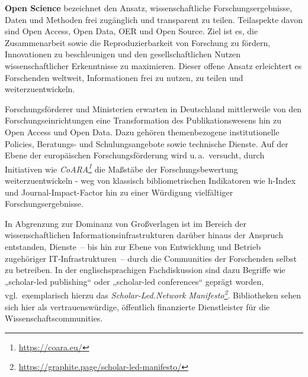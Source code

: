 \documentclass[
  11pt,
  letterpaper,
  DIV=11,
  twoside]{scrreprt}
\DeclareRobustCommand{\href}[2]{#2\footnote{\url{#1}}}
\begin{document}
\begin{tcolorbox}[enhanced jigsaw, leftrule=.75mm, toprule=.15mm, left=2mm, opacityback=0, arc=.35mm, colback=white, breakable, colframe=quarto-callout-important-color-frame, rightrule=.15mm, bottomrule=.15mm]
\begin{minipage}[t]{5.5mm}
\textcolor{quarto-callout-important-color}{\faExclamation}
\end{minipage}%
\begin{minipage}[t]{\textwidth - 5.5mm}

\textbf{Open Science} bezeichnet den Ansatz, wissenschaftliche
Forschungsergebnisse, Daten und Methoden frei zugänglich und transparent
zu teilen. Teilaspekte davon sind Open Access, Open Data, OER und Open
Source. Ziel ist es, die Zusammenarbeit sowie die Reproduzierbarkeit von
Forschung zu fördern, Innovationen zu beschleunigen und den
gesellschaftlichen Nutzen wissenschaftlicher Erkenntnisse zu maximieren.
Dieser offene Ansatz erleichtert es Forschenden weltweit, Informationen
frei zu nutzen, zu teilen und weiterzuentwickeln.

\end{minipage}%
\end{tcolorbox}

Forschungsförderer und Ministerien erwarten in Deutschland mittlerweile
von den Forschungseinrichtungen eine Transformation des
Publikationswesens hin zu Open Access und Open Data. Dazu gehören
themenbezogene institutionelle Policies, Beratungs- und
Schulungsangebote sowie technische Dienste. Auf der Ebene der
europäischen Forschungsförderung wird u.\,a.~versucht, durch Initiativen
wie \emph{\href{https://coara.eu/}{CoARA}} die Maßstäbe der
Forschungsbewertung weiterzuentwickeln - weg von klassisch
bibliometrischen Indikatoren wie h-Index und Journal-Impact-Factor hin
zu einer Würdigung vielfältiger Forschungsergebnisse.

In Abgrenzung zur Dominanz von Großverlagen ist im Bereich der
wissenschaftlichen Informationsinfrastrukturen darüber hinaus der
Anspruch entstanden, Dienste~-- bis hin zur Ebene von Entwicklung und
Betrieb zugehöriger IT-Infrastrukturen~-- durch die Communities der
Forschenden selbst zu betreiben. In der englischsprachigen
Fachdiskussion sind dazu Begriffe wie „scholar-led publishing`` oder
„scholar-led conferences`` geprägt worden, vgl.~exemplarisch hierzu das
\emph{\href{https://graphite.page/scholar-led-manifesto/}{Scholar-Led.Network
Manifesto}}. Bibliotheken sehen sich hier als vertrauenswürdige,
öffentlich finanzierte Dienstleister für die Wissenschaftscommunities.
\end{document}
